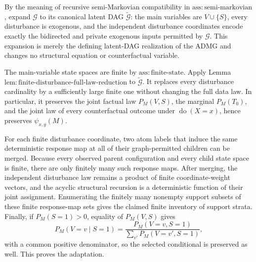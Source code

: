 By the meaning of recursive semi-Markovian compatibility in \(\mathrm{ass{:}semi\text{-}markovian}\), expand \(\mathcal G\) to its canonical latent DAG \(\widetilde{\mathcal G}\): the main variables are \(V\cup\{S\}\), every disturbance is exogenous, and the independent disturbance coordinates encode exactly the bidirected and private exogenous inputs permitted by \(\mathcal G\).  This expansion is merely the defining latent-DAG realization of the ADMG and changes no structural equation or counterfactual variable.

The main-variable state spaces are finite by \(\mathrm{ass{:}finite\text{-}state}\).  Apply Lemma \(\mathrm{lem{:}finite\text{-}disturbance\text{-}full\text{-}law\text{-}reduction}\) to \(\widetilde{\mathcal G}\).  It replaces every disturbance cardinality by a sufficiently large finite one without changing the full data law.  In particular, it preserves the joint factual law \(P_M(V,S)\), the marginal \(P_M(T_0)\), and the joint law of every counterfactual outcome under \(\operatorname{do}(X=x)\), hence preserves \(\psi_{x,y}(M)\).

For each finite disturbance coordinate, two atom labels that induce the same deterministic response map at all of their graph-permitted children can be merged.  Because every observed parent configuration and every child state space is finite, there are only finitely many such response maps.  After merging, the independent disturbance law remains a product of finite coordinate-weight vectors, and the acyclic structural recursion is a deterministic function of their joint assignment.  Enumerating the finitely many nonempty support subsets of these finite response-map sets gives the claimed finite inventory of support strata.  Finally, if \(P_M(S=1)>0\), equality of \(P_M(V,S)\) gives
\[
 P_M(V=v\mid S=1)=\frac{P_M(V=v,S=1)}{\sum_{v'}P_M(V=v',S=1)},
\]
with a common positive denominator, so the selected conditional is preserved as well.  This proves the adaptation.